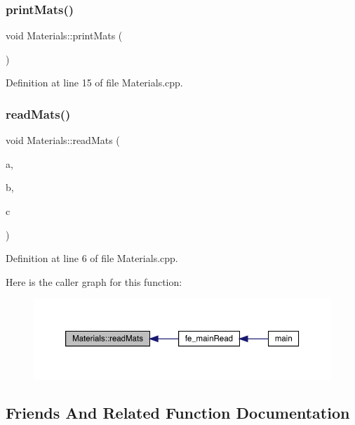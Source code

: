 \subsubsection{\texorpdfstring{print\+Mats()}{printMats()}}
{\footnotesize\ttfamily void Materials\+::print\+Mats (\begin{DoxyParamCaption}{ }\end{DoxyParamCaption})}



Definition at line 15 of file Materials.\+cpp.

\mbox{\label{class_materials_a06e59a5742730b2292d39b7488523505}} 
\subsubsection{\texorpdfstring{read\+Mats()}{readMats()}}
{\footnotesize\ttfamily void Materials\+::read\+Mats (\begin{DoxyParamCaption}\item[{int}]{a,  }\item[{std\+::string}]{b,  }\item[{Vector\+Xd}]{c }\end{DoxyParamCaption})}



Definition at line 6 of file Materials.\+cpp.

Here is the caller graph for this function\+:
\nopagebreak
\begin{figure}[H]
\begin{center}
\leavevmode
\includegraphics[width=350pt]{class_materials_a06e59a5742730b2292d39b7488523505_icgraph}
\end{center}
\end{figure}


\subsection{Friends And Related Function Documentation}
\mbox{\label{class_materials_af7ffbad6dfcc99fc88b130c1a7b1720a}} 
